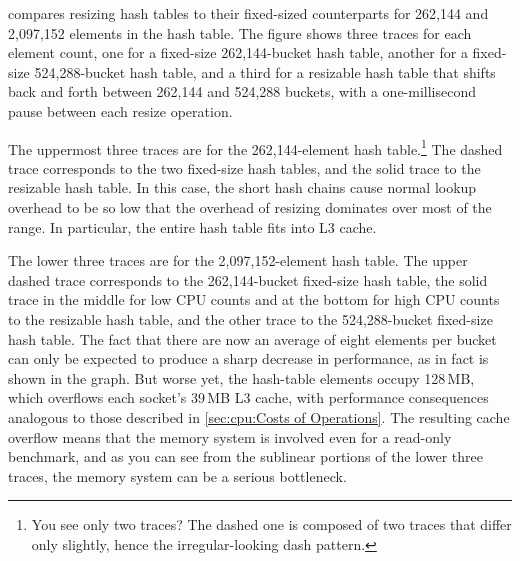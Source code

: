 compares resizing hash tables to their fixed-sized counterparts
for 262,144 and 2,097,152 elements in the hash table.
The figure shows three traces for each element count, one
for a fixed-size 262,144-bucket hash table, another for a
fixed-size 524,288-bucket hash table, and a third for a resizable
hash table that shifts back and forth between 262,144 and 524,288
buckets, with a one-millisecond pause between each resize operation.

The uppermost three traces are for the 262,144-element hash table.\footnote{
	You see only two traces?
	The dashed one is composed of two traces that differ
	only slightly, hence the irregular-looking dash pattern.}
The dashed trace corresponds to the two fixed-size hash tables,
and the solid trace to the resizable hash table.
In this case, the short hash chains cause normal lookup overhead
to be so low that the overhead of resizing dominates over most
of the range.
In particular, the entire hash table fits into L3 cache.

The lower three traces are for the 2,097,152-element hash table.
The upper dashed trace corresponds to the 262,144-bucket fixed-size
hash table, the solid trace in the middle for low CPU counts and at
the bottom for high CPU counts to the resizable hash table,
and the other trace to the 524,288-bucket fixed-size hash table.
The fact that there are now an average of eight elements per bucket
can only be expected to produce a sharp decrease in performance,
as in fact is shown in the graph.
But worse yet, the hash-table elements occupy 128\,MB, which overflows
each socket's 39\,MB L3 cache, with performance consequences analogous
to those described in \cref{sec:cpu:Costs of Operations}.
The resulting cache overflow means that the memory system is involved
even for a read-only benchmark, and as you can see from the sublinear
portions of the lower three traces, the memory system can be a serious
bottleneck.

